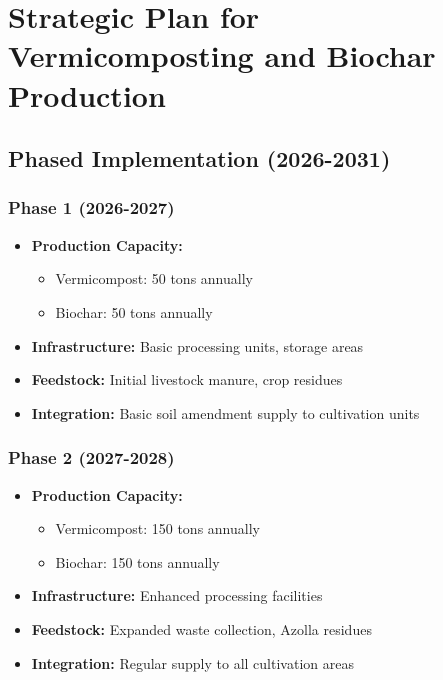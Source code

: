 \section{Strategic Plan for Vermicomposting and Biochar Production}

\subsection{Phased Implementation (2026-2031)}

\subsubsection{Phase 1 (2026-2027)}
\begin{itemize}
    \item \textbf{Production Capacity:}
    \begin{itemize}
        \item Vermicompost: 50 tons annually
        \item Biochar: 50 tons annually
    \end{itemize}
    \item \textbf{Infrastructure:} Basic processing units, storage areas
    \item \textbf{Feedstock:} Initial livestock manure, crop residues
    \item \textbf{Integration:} Basic soil amendment supply to cultivation units
\end{itemize}

\subsubsection{Phase 2 (2027-2028)}
\begin{itemize}
    \item \textbf{Production Capacity:}
    \begin{itemize}
        \item Vermicompost: 150 tons annually
        \item Biochar: 150 tons annually
    \end{itemize}
    \item \textbf{Infrastructure:} Enhanced processing facilities
    \item \textbf{Feedstock:} Expanded waste collection, Azolla residues
    \item \textbf{Integration:} Regular supply to all cultivation areas
\end{itemize}


